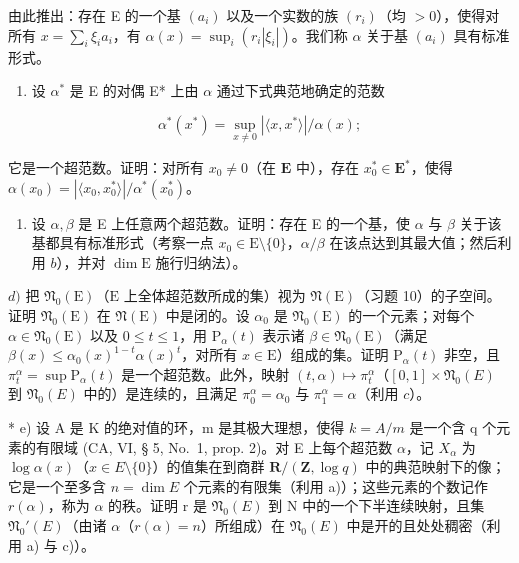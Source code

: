 由此推出：存在 E 的一个基 \((a_{i})\) 以及一个实数的族 \((r_i)\)（均 \(>0\)），使得对所有 \(x = \sum_{i} \xi_{i} a_{i}\)，有 \(\alpha(x) = \sup_{i} (r_{i} |\xi_{i}|)\)。我们称 \(\alpha\) 关于基 \((a_{i})\) 具有标准形式。

\begin{enumerate}
\def\labelenumi{\alph{enumi})}
\setcounter{enumi}{1}
\tightlist
\item
  设 \(\alpha^{*}\) 是 E 的对偶 E* 上由 \(\alpha\) 通过下式典范地确定的范数
\end{enumerate}

\[
\alpha^ {*} (x ^ {*}) = \sup _ {x \neq 0} | \langle x, x ^ {*} \rangle | / \alpha (x);
\]

它是一个超范数。证明：对所有 \(x_0 \neq 0\)（在 \(\mathbf{E}\) 中），存在 \(x_0^* \in \mathbf{E}^*\)，使得 \(\alpha(x_0) = |\langle x_0, x_0^* \rangle| / \alpha^*(x_0^*)\)。

\begin{enumerate}
\def\labelenumi{\alph{enumi})}
\setcounter{enumi}{2}
\tightlist
\item
  设 \(\alpha, \beta\) 是 E 上任意两个超范数。证明：存在 E 的一个基，使 \(\alpha\) 与 \(\beta\) 关于该基都具有标准形式（考察一点 \(x_0 \in \mathrm{E} \setminus \{0\}\)，\(\alpha / \beta\) 在该点达到其最大值；然后利用 \(b\)），并对 \(\dim \mathrm{E}\) 施行归纳法）。
\end{enumerate}

\(d)\) 把 \(\mathfrak{N}_0(\mathrm{E})\)（\(\mathrm{E}\) 上全体超范数所成的集）视为 \(\mathfrak{N}(\mathrm{E})\)（习题 10）的子空间。证明 \(\mathfrak{N}_0(\mathrm{E})\) 在 \(\mathfrak{N}(\mathrm{E})\) 中是闭的。设 \(\alpha_0\) 是 \(\mathfrak{N}_0(\mathrm{E})\) 的一个元素；对每个 \(\alpha \in \mathfrak{N}_0(\mathrm{E})\) 以及 \(0 \leqslant t \leqslant 1\)，用 \(\mathrm{P}_{\alpha}(t)\) 表示诸 \(\beta \in \mathfrak{N}_0(\mathrm{E})\)（满足 \(\beta(x) \leqslant \alpha_0(x)^{1 - t}\alpha(x)^t\)，对所有 \(x \in \mathrm{E}\)）组成的集。证明 \(\mathrm{P}_{\alpha}(t)\) 非空，且 \(\pi_t^\alpha = \sup \mathrm{P}_{\alpha}(t)\) 是一个超范数。此外，映射 \((t, \alpha) \mapsto \pi_t^\alpha\)（\([0, 1] \times \mathfrak{N}_0(E)\) 到 \(\mathfrak{N}_0(E)\) 中的）是连续的，且满足 \(\pi_0^\alpha = \alpha_0\) 与 \(\pi_1^\alpha = \alpha\)（利用 \(c\)）。

* e) 设 A 是 K 的绝对值的环，m 是其极大理想，使得 \(k = A/m\) 是一个含 q 个元素的有限域 (CA, VI, § 5, No.~1, prop. 2)。对 E 上每个超范数 \(\alpha\)，记 \(X_{\alpha}\) 为 \(\log \alpha(x)\)（\(x \in E \setminus \{0\}\)）的值集在到商群 \(\mathbf{R}/(\mathbf{Z}, \log q)\) 中的典范映射下的像；它是一个至多含 \(n = \dim E\) 个元素的有限集（利用 a)）；这些元素的个数记作 \(r(\alpha)\)，称为 \(\alpha\) 的秩。证明 r 是 \(\mathfrak{N}_{0}(E)\) 到 N 中的一个下半连续映射，且集 \(\mathfrak{N}_{0}'(E)\)（由诸 \(\alpha\)（\(r(\alpha) = n\)）所组成）在 \(\mathfrak{N}_{0}(E)\) 中是开的且处处稠密（利用 a) 与 c)）。

